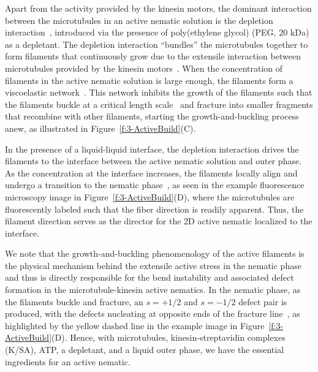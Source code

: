 Apart from the activity provided by the kinesin motors, the dominant interaction between the microtubules in an active nematic solution is the depletion interaction~\cite{RN251}, introduced via the presence of poly(ethylene glycol) (PEG, 20 kDa) as a depletant.
The depletion interaction ``bundles'' the microtubules together to form filaments that continuously grow due to the extensile interaction between microtubules provided by the kinesin motors~\cite{RN244,RN4,RN3}.
When the concentration of filaments in the active nematic solution is large enough, the filaments form a viscoelastic network~\cite{RN253,RN3}.
This network inhibits the growth of the filaments such that the filaments buckle at a critical length scale~\cite{RN253,RN3} and fracture into smaller fragments that recombine with other filaments, starting the growth-and-buckling process anew, as illustrated in Figure~\ref{f:3-ActiveBuild}(C).

In the presence of a liquid-liquid interface, the depletion interaction drives the filaments to the interface between the active nematic solution and outer phase.
As the concentration at the interface increases, the filaments locally align and undergo a transition to the nematic phase~\cite{RN3,RN135,RN134}, as seen in the example fluorescence microscopy image in Figure~\ref{f:3-ActiveBuild}(D), where the microtubules are fluorescently labeled such that the fiber direction is readily apparent.
Thus, the filament direction serves as the director for the 2D active nematic localized to the interface.

We note that the growth-and-buckling phenomenology of the active filaments is the physical mechanism behind the extensile active stress in the nematic phase and thus is directly responsible for the bend instability and associated defect formation in the microtubule-kinesin active nematics.
In the nematic phase, as the filaments buckle and fracture, an $s = +1/2$ and $s = -1/2$ defect pair is produced, with the defects nucleating at opposite ends of the fracture line~\cite{RN3,RN11}, as highlighted by the yellow dashed line in the example image in Figure~\ref{f:3-ActiveBuild}(D).
Hence, with microtubules, kinesin-streptavidin complexes (K/SA), ATP, a depletant, and a liquid outer phase, we have the essential ingredients for an active nematic.

